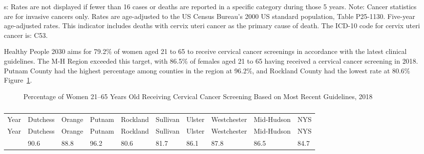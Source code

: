 \documentclass[
  english,
  letterpaper,
]{report}
\begin{document}
\begin{tcolorbox}[enhanced jigsaw, breakable, leftrule=.75mm, title=\textcolor{quarto-callout-note-color}{\faInfo}\hspace{0.5em}{Note}, bottomrule=.15mm, opacityback=0, left=2mm, colback=white, bottomtitle=1mm, coltitle=black, colbacktitle=quarto-callout-note-color!10!white, colframe=quarto-callout-note-color-frame, opacitybacktitle=0.6, toptitle=1mm, titlerule=0mm, arc=.35mm, rightrule=.15mm, toprule=.15mm]

s: Rates are not displayed if fewer than 16 cases or deaths are reported
in a specific category during those 5 years. Note: Cancer statistics are
for invasive cancers only. Rates are age-adjusted to the US Census
Bureau's 2000 US standard population, Table P25-1130. Five-year
age-adjusted rates. This indicator includes deaths with cervix uteri
cancer as the primary cause of death. The ICD-10 code for cervix uteri
cancer is: C53.

\end{tcolorbox}

Healthy People 2030 aims for 79.2\% of women aged 21 to 65 to receive
cervical cancer screenings in accordance with the latest clinical
guidelines. The M-H Region exceeded this target, with 86.5\% of females
aged 21 to 65 having received a cervical cancer screening in 2018.
Putnam County had the highest percentage among counties in the region at
96.2\%, and Rockland County had the lowest rate at 80.6\%
Figure~\ref{fig-cervutca-screening-percent}.

\begin{figure}


\caption{\label{fig-cervutca-screening-percent}Percentage of Women
21--65 Years Old Receiving Cervical Cancer Screening Based on Most
Recent Guidelines, 2018}

\end{figure}%

\begin{longtable}[]{@{}llllllllll@{}}

\caption{\label{tbl-cervutca-screening-percent}Percentage of Women
21--65 Years Old Receiving Cervical Cancer Screening Based on Most
Recent Guidelines, 2018}

\tabularnewline

\caption{}\label{T_c0a3f}\tabularnewline
\toprule\noalign{}
Year & Dutchess & Orange & Putnam & Rockland & Sullivan & Ulster &
Westchester & Mid-Hudson & NYS \\
\midrule\noalign{}
\endfirsthead
\toprule\noalign{}
Year & Dutchess & Orange & Putnam & Rockland & Sullivan & Ulster &
Westchester & Mid-Hudson & NYS \\
\midrule\noalign{}
\endhead
\bottomrule\noalign{}
\endlastfoot
2018 & 90.6 & 88.8 & 96.2 & 80.6 & 81.7 & 86.1 & 87.8 & 86.5 & 84.7 \\

\end{longtable}
\end{document}
